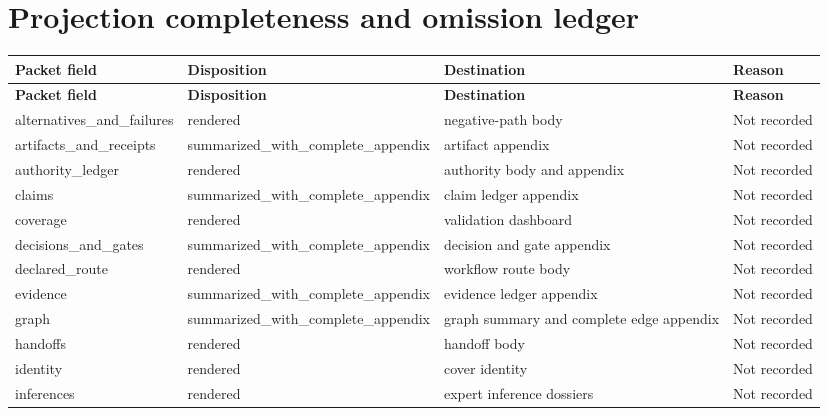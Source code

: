 \documentclass[10pt,a4paper]{article}
\begin{document}
\section{Projection completeness and omission ledger}\label{app-dispositions}
\begingroup\setlength{\tabcolsep}{2pt}\small
\begin{longtable}{@{}>{\raggedright\arraybackslash}p{.18\linewidth}>{\raggedright\arraybackslash}p{.18\linewidth}>{\raggedright\arraybackslash}p{.22\linewidth}>{\raggedright\arraybackslash}p{.24\linewidth}@{}}
\toprule
\textbf{Packet field} & \textbf{Disposition} & \textbf{Destination} & \textbf{Reason}\\\midrule
\endfirsthead
\toprule
\textbf{Packet field} & \textbf{Disposition} & \textbf{Destination} & \textbf{Reason}\\\midrule
\endhead
alternativ\allowbreak{}es\_\allowbreak{}and\_\allowbreak{}failures & rendered & negative-\allowbreak{}path body & Not recorded\\
artifacts\_\allowbreak{}and\_\allowbreak{}receipts & summarized\allowbreak{}\_\allowbreak{}with\_\allowbreak{}complete\_\allowbreak{}appendix & artifact appendix & Not recorded\\
authority\_\allowbreak{}ledger & rendered & authority body and appendix & Not recorded\\
claims & summarized\allowbreak{}\_\allowbreak{}with\_\allowbreak{}complete\_\allowbreak{}appendix & claim ledger appendix & Not recorded\\
coverage & rendered & validation\allowbreak{} dashboard & Not recorded\\
decisions\_\allowbreak{}and\_\allowbreak{}gates & summarized\allowbreak{}\_\allowbreak{}with\_\allowbreak{}complete\_\allowbreak{}appendix & decision and gate appendix & Not recorded\\
declared\_\allowbreak{}route & rendered & workflow route body & Not recorded\\
evidence & summarized\allowbreak{}\_\allowbreak{}with\_\allowbreak{}complete\_\allowbreak{}appendix & evidence ledger appendix & Not recorded\\
graph & summarized\allowbreak{}\_\allowbreak{}with\_\allowbreak{}complete\_\allowbreak{}appendix & graph summary and complete edge appendix & Not recorded\\
handoffs & rendered & handoff body & Not recorded\\
identity & rendered & cover identity & Not recorded\\
inferences\allowbreak{} & rendered & expert inference dossiers & Not recorded\\

\end{longtable}
\end{document}
